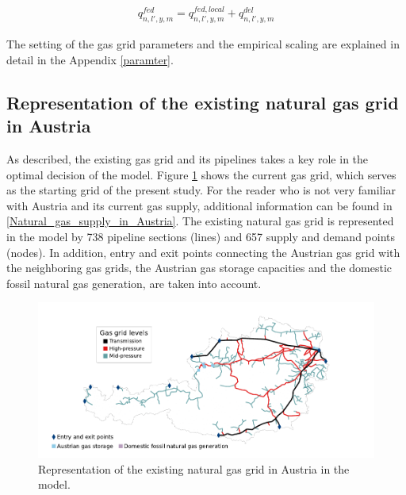 \begin{align}\label{gas_balance_source}
	q^{fed}_{n,l',y,m} = q^{fed,local}_{n,l',y,m} + q^{del}_{n,l',y,m}
\end{align}

The setting of the gas grid parameters and the empirical scaling are explained in detail in the Appendix \ref{paramter}. 

\subsection{Representation of the existing natural gas grid in Austria}\label{gas_grid_austria}
As described, the existing gas grid and its pipelines takes a key role in the optimal decision of the model. Figure \ref{method:existing_gas_grid} shows the current gas grid, which serves as the starting grid of the present study. For the reader who is not very familiar with Austria and its current gas supply, additional information can be found in \ref{Natural_gas_supply_in_Austria}. The existing natural gas grid is represented in the model by 738 pipeline sections (lines) and 657 supply and demand points (nodes). In addition, entry and exit points connecting the Austrian gas grid with the neighboring gas grids, the Austrian gas storage capacities and the domestic fossil natural gas generation, are taken into account. 

\begin{figure}[h]
	\centering
	\includegraphics[width=1\linewidth]{figures/method/existing_gas_grid/2023_existing_natural_gas_grid.pdf}
	\caption{Representation of the existing natural gas grid in Austria in the model.}
	\label{method:existing_gas_grid}
\end{figure}

